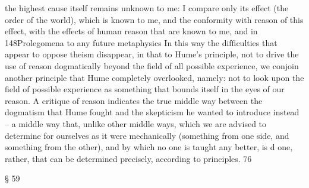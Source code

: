the highest cause itself remains unknown to me: I compare only its effect (the
order of the world), which is known to me, and the conformity with reason
of this effect, with the effects of human reason that are known to me, and in
148Prolegomena to any future metaphysics
In this way the difﬁculties that appear to oppose theism disappear,
in that to Hume’s principle, not to drive the use of reason dogmatically
beyond the ﬁeld of all possible experience, we conjoin another principle
that Hume completely overlooked, namely: not to look upon the ﬁeld
of possible experience as something that bounds itself in the eyes of our
reason. A critique of reason indicates the true middle way between the
dogmatism that Hume fought and the skepticism he wanted to introduce
instead – a middle way that, unlike other middle ways, which we are
advised to determine for ourselves as it were mechanically (something
from one side, and something from the other), and by which no one
is taught any better, is d one, rather, that can be determined precisely,
according to principles. 76

§ 59

